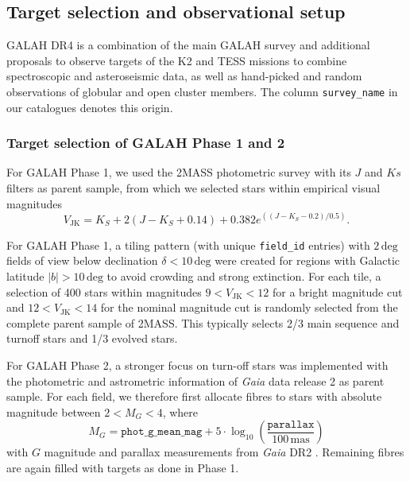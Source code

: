 \documentclass[
  journal=pasa,
  manuscript=research-paper, %
  year=2023,
  volume=37
]{cup-journal}
\newcommand{\Gaia}{\textit{Gaia}\xspace}
\begin{document}
\subsection{Target selection and observational setup} \label{sec:target_selection_observations}

GALAH DR4 is a combination of the main GALAH survey and additional proposals to observe targets of the K2 \cite{Sharma2019} and TESS missions \cite{Sharma2018} to combine spectroscopic and asteroseismic data, as well as hand-picked and random observations of globular and open cluster members. The column \texttt{survey\_name} in our catalogues denotes this origin.

\subsubsection{Target selection of GALAH Phase 1 and 2}

For GALAH Phase 1, we used the 2MASS photometric survey \citep{Skrutskie2006} with its $J$ and $Ks$ filters as parent sample, from which we selected stars within empirical visual magnitudes
\begin{equation}
V_\mathrm{JK} = K_S+2(J-K_S+0.14)+0.382e^{((J-K_S-0.2)/0.5)}.
\end{equation}

For GALAH Phase 1, a tiling pattern (with unique \texttt{field\_id} entries) with $2\,\mathrm{deg}$ fields of view below declination $\delta < 10\,\mathrm{deg}$ were created for regions with Galactic latitude $\vert b \vert > 10\,\mathrm{deg}$ to avoid crowding and strong extinction. For each tile, a selection of 400 stars within magnitudes $9 < V_\mathrm{JK} < 12$ for a bright magnitude cut and $12 < V_\mathrm{JK} < 14$ for the nominal magnitude cut is randomly selected from the complete parent sample of 2MASS. This typically selects 2/3 main sequence and turnoff stars and 1/3 evolved stars.

For GALAH Phase 2, a stronger focus on turn-off stars was implemented with the photometric and astrometric information of \Gaia data release 2 as parent sample. For each field, we therefore first allocate fibres to stars with absolute magnitude between $2 < M_G < 4$, where
\begin{equation}
M_G = \texttt{phot\_g\_mean\_mag} + 5 \cdot \log_{10} \left( \frac{\texttt{parallax}}{100\,\mathrm{mas}} \right)
\end{equation}
with $G$ magnitude and parallax measurements from \Gaia DR2 \citep{Brown2018, Evans2018, Lindegren2018}. Remaining fibres are again filled with targets as done in Phase 1.
\end{document}

